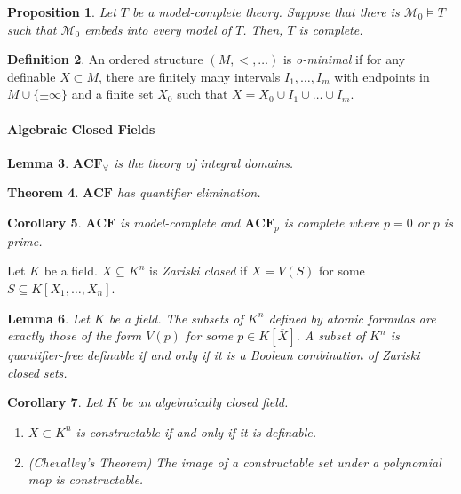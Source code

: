 \documentclass{amsart}
\newtheorem{theorem}{Theorem}[section]
\newtheorem{lemma}[theorem]{Lemma}
\newtheorem{proposition}[theorem]{Proposition}
\newtheorem{corollary}[theorem]{Corollary}
\theoremstyle{definition}
\newtheorem{definition}[theorem]{Definition}
\numberwithin{equation}{section}
\begin{document}
\begin{proposition}
    Let $T$ be a model-complete theory. 
    Suppose that there is $\mathcal{M}_0 \models T$ such that $\mathcal{M}_0$ embeds into every model of $T$. 
    Then, $T$ is complete.
\end{proposition}

\begin{definition}
    An ordered structure $(M,<,\dots)$ is \emph{o-minimal} if
    for any definable $X \subset M$,
    there are finitely many intervals $I_1,\dots,I_m$ with endpoints in $M \cup \{\pm\infty\}$ and a finite set $X_0$ such that $X = X_0 \cup I_1 \cup \dots \cup I_m$.
\end{definition}

\paragraph{\bfseries Algebraic Closed Fields}

\begin{lemma}
    $\mathbf{ACF}_{\forall}$ is the theory of integral domains.
\end{lemma}

\begin{theorem}
    $\mathbf{ACF}$ has quantifier elimination.
\end{theorem}

\begin{corollary}
    $\mathbf{ACF}$ is model-complete and $\mathbf{ACF}_p$ is complete where $p = 0$ or $p$ is prime.
\end{corollary}

Let $K$ be a field.
$X \subseteq K^n$ is \emph{Zariski closed} if $X = V(S)$ for some $S \subseteq K[X_1,\dots,X_n]$.

\begin{lemma}
    Let $K$ be a field.
    The subsets of $K^n$ defined by atomic formulas are exactly those of the form $V(p)$ for some $p \in K[\overline{X}]$.
    A subset of $K^n$ is quantifier-free definable if and only if it is a Boolean combination of Zariski closed sets.
\end{lemma}

\begin{corollary}
    Let $K$ be an algebraically closed field.
    \begin{enumerate}[label = {\roman*)}]
        \item $X \subset K^n$ is constructable if and only if it is definable.
        \item (Chevalley's Theorem) The image of a constructable set under a polynomial map is constructable.
    \end{enumerate}
\end{corollary}
\end{document}
